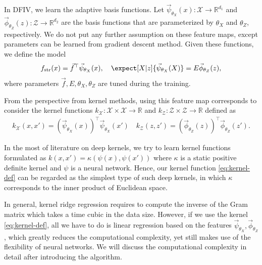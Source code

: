 In DFIV, we learn the adaptive basis functions. Let $\vec{\psi}_{\theta_X}(x): \mathcal{X} \to \mathbb{R}^{d_1}$ and $\vec{\phi}_{\theta_Z}(z):\mathcal{Z} \to \mathbb{R}^{d_2}$ are the basis functions that are parameterized by $\theta_X$ and $\theta_Z$, respectively. We do not put any further assumption on these feature maps, except parameters can be learned from gradient descent method. Given these functions, we define the model
\begin{align*}
    f_\mathrm{str}(x) = \vec{f}^\top \vec{\psi}_{\theta_X}(x), \quad \expect[X|z]{\vec{\psi}_{\theta_X}(X)} = E\vec{\phi}_{\theta_Z}(z),
\end{align*}
where parameters $\vec{f}, E, \theta_X, \theta_Z$ are tuned during the training.

From the perspective from kernel methods, using this feature map corresponds to consider the kernel functions $k_\mathcal{X}: \mathcal{X}\times\mathcal{X} \to \mathbb{R}$ and $k_\mathcal{Z}: \mathcal{Z}\times\mathcal{Z} \to \mathbb{R}$ defined as
\begin{align}
    k_\mathcal{X}(x, x') = (\vec{\psi}_{\theta_X}(x))^\top \vec{\psi}_{\theta_X}(x') \quad k_\mathcal{Z}(z, z') = (\vec{\phi}_{\theta_Z}(z))^\top \vec{\phi}_{\theta_Z}(z'). \label{eq:kernel-def}
\end{align}

In the most of literature on deep kernels, we try to learn kernel functions formulated as $k(x,x') = \kappa(\psi(x), \psi(x'))$ where $\kappa$ is a static positive definite kernel and $\psi$ is a neural network. Hence, our kernel function \eqref{eq:kernel-def} can be regarded as the simplest type of such deep kernels, in which $\kappa$ corresponds to the inner product of Euclidean space.

In general, kernel ridge regression requires to compute the inverse of the Gram matrix which takes a time cubic in the data size. However, if we use the kernel \eqref{eq:kernel-def}, all we have to do is linear regression based on the features $\vec{\psi}_{\theta_X}, \vec{\phi}_{\theta_Z}$, which greatly reduces the computational complexity, yet still makes use of the flexibility of neural networks. We will discuss the computational complexity in detail after introducing the algorithm.